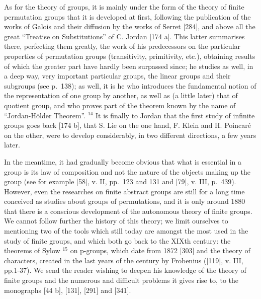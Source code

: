 As for the theory of groups, it is mainly under the form of the theory of finite permutation groups that it is developed at first, following the publication of the works of Galois and their diffusion by the works of Serret {[}284{]}, and above all the great ``Treatise on Substitutions'' of C. Jordan {[}174 a{]}. This latter summarises there, perfecting them greatly, the work of his predecessors on the particular properties of permutation groups (transitivity, primitivity, etc.), obtaining results of which the greater part have hardly been surpassed since; he studies as well, in a deep way, very important particular groups, the linear groups and their subgroups (see p.~138); as well, it is he who introduces the fundamental notion of the representation of one group by another, as well as (a little later) that of quotient group, and who proves part of the theorem known by the name of ``Jordan-Hölder Theorem''. \(^{14}\) It is finally to Jordan that the first study of infinite groups goes back {[}174 b{]}, that S. Lie on the one hand, F. Klein and H. Poincaré on the other, were to develop considerably, in two different directions, a few years later.

In the meantime, it had gradually become obvious that what is essential in a group is its law of composition and not the nature of the objects making up the group (see for example {[}58{]}, v. II, pp.~123 and 131 and {[}79{]}, v. III, p.~439). However, even the researches on finite abstract groups are still for a long time conceived as studies about groups of permutations, and it is only around 1880 that there is a conscious development of the autonomous theory of finite groups. We cannot follow further the history of this theory; we limit ourselves to mentioning two of the tools which still today are amongst the most used in the study of finite groups, and which both go back to the XIXth century: the theorems of Sylow \(^{15}\) on p-groups, which date from 1872 {[}303{]} and the theory of characters, created in the last years of the century by Frobenius ({[}119{]}, v. III, pp.1-37). We send the reader wishing to deepen his knowledge of the theory of finite groups and the numerous and difficult problems it gives rise to, to the monographs {[}44 b{]}, {[}131{]}, {[}291{]} and {[}341{]}.

